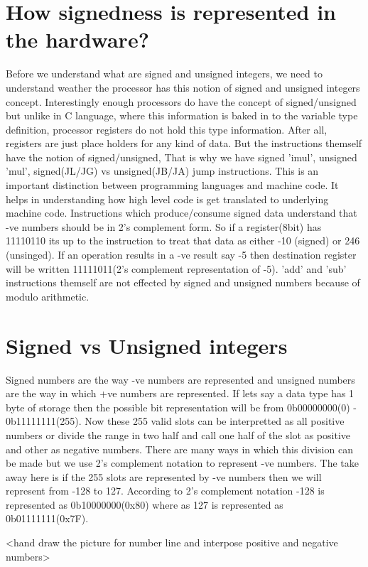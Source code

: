 \documentclass{article}
\begin{document}
\section{How signedness is represented in the hardware?}
Before we understand what are signed and unsigned integers, we need to
understand weather the processor has this notion of signed and unsigned
integers concept. Interestingly enough processors do have the concept of
signed/unsigned but unlike in C language, where this information is baked in to
the variable type definition, processor registers do not hold this type
information. After all, registers are just place holders for any kind of
data. But the instructions themself have the notion of signed/unsigned, That
is why we have signed 'imul', unsigned 'mul', signed(JL/JG) vs unsigned(JB/JA)
jump instructions. This is an important distinction between programming
languages and machine code. It helps in understanding how high level code is get
translated to underlying machine code. Instructions which produce/consume signed
data understand that -ve numbers should be in 2's complement form. So if a
register(8bit) has 11110110 its up to the instruction to treat that data as
either -10 (signed) or 246 (unsinged). If an operation results in a -ve result
say -5 then destination register will be written 11111011(2's complement
representation of -5). 'add' and 'sub' instructions themself are not effected
by signed and unsigned numbers because of modulo arithmetic.

\section{Signed vs Unsigned integers}
Signed numbers are the way -ve numbers are represented and unsigned numbers are
the way in which +ve numbers are represented. If lets say a data type has 1
byte of storage then the possible bit representation will be from  0b00000000(0)
- 0b11111111(255). Now these 255 valid slots can be interpretted as all positive
numbers or divide the range in two half and call one half of the slot as
positive and other as negative numbers. There are many ways in which this
division can be made but we use 2's complement notation to represent -ve
numbers. The take away here is if the 255 slots are represented by -ve numbers
then we will represent from -128 to 127. According to 2's complement notation
-128 is represented as 0b10000000(0x80) where as 127 is represented as
0b01111111(0x7F).

<hand draw the picture for number line and interpose positive and negative
numbers>
\end{document}
